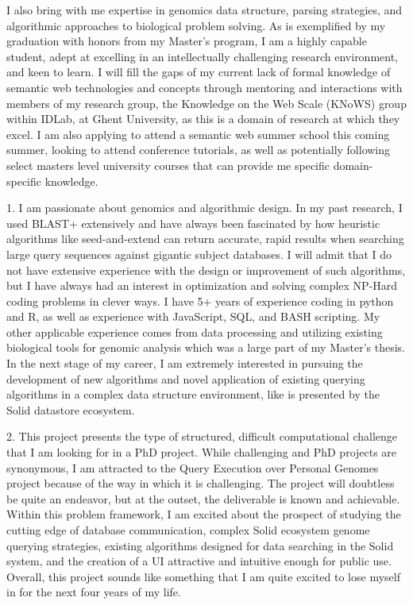 {I also bring with me expertise in genomics data structure, parsing strategies, and algorithmic approaches to biological problem solving. 
As is exemplified by my graduation with honors from my Master's program, I am a highly capable student, adept at excelling in an intellectually challenging research environment, and keen to learn.
I will fill the gaps of my current lack of formal knowledge of semantic web technologies and concepts through mentoring and interactions with members of my research group, the Knowledge on the Web Scale (KNoWS) group within IDLab, at Ghent University, as this is a domain of research at which they excel.
I am also applying to attend a semantic web summer school this coming summer, looking to attend conference tutorials, as well as potentially following select masters level university courses that can provide me specific domain-specific knowledge.


1. I am passionate about genomics and algorithmic design. 
In my past research, I used BLAST+ extensively and have always been fascinated by how heuristic algorithms like seed-and-extend can return accurate, rapid results when searching large query sequences against gigantic subject databases. 
I will admit that I do not have extensive experience with the design or improvement of such algorithms, but I have always had an interest in optimization and solving complex NP-Hard coding problems in clever ways. 
I have 5+ years of experience coding in python and R, as well as experience with JavaScript, SQL, and BASH scripting. 
My other applicable experience comes from data processing and utilizing existing biological tools for genomic analysis which was a large part of my Master’s thesis. 
In the next stage of my career, I am extremely interested in pursuing the development of new algorithms and novel application of existing querying algorithms in a complex data structure environment, like is presented by the Solid datastore ecosystem.

2. This project presents the type of structured, difficult computational challenge that I am looking for in a PhD project. 
While challenging and PhD projects are synonymous, I am attracted to the Query Execution over Personal Genomes project because of the way in which it is challenging. 
The project will doubtless be quite an endeavor, but at the outset, the deliverable is known and achievable. 
Within this problem framework, I am excited about the prospect of studying the cutting edge of database communication, complex Solid ecosystem genome querying strategies, existing algorithms designed for data searching in the Solid system, and the creation of a UI attractive and intuitive enough for public use. 
Overall, this project sounds like something that I am quite excited to lose myself in for the next four years of my life. 

}
